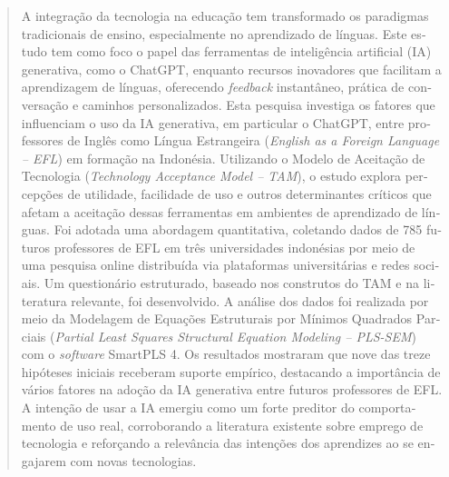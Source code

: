 \documentclass[english]{textolivre}
\begin{document}
\begin{polyabstract}
\begin{portuguese}
\begin{abstract}
A integração da tecnologia na educação tem transformado os paradigmas tradicionais de ensino, especialmente no aprendizado de línguas. Este estudo tem como foco o papel das ferramentas de inteligência artificial (IA) generativa, como o ChatGPT, enquanto recursos inovadores que facilitam a aprendizagem de línguas, oferecendo \textit{feedback} instantâneo, prática de conversação e caminhos personalizados. Esta pesquisa investiga os fatores que influenciam o uso da IA generativa, em particular o ChatGPT, entre professores de Inglês como Língua Estrangeira (\textit{English as a Foreign Language – EFL}) em formação na Indonésia. Utilizando o Modelo de Aceitação de Tecnologia (\textit{Technology Acceptance Model – TAM}), o estudo explora percepções de utilidade, facilidade de uso e outros determinantes críticos que afetam a aceitação dessas ferramentas em ambientes de aprendizado de línguas. Foi adotada uma abordagem quantitativa, coletando dados de 785 futuros professores de EFL em três universidades indonésias por meio de uma pesquisa online distribuída via plataformas universitárias e redes sociais. Um questionário estruturado, baseado nos construtos do TAM e na literatura relevante, foi desenvolvido. A análise dos dados foi realizada por meio da Modelagem de Equações Estruturais por Mínimos Quadrados Parciais (\textit{Partial Least Squares Structural Equation Modeling – PLS-SEM}) com o \textit{software} SmartPLS 4. Os resultados mostraram que nove das treze hipóteses iniciais receberam suporte empírico, destacando a importância de vários fatores na adoção da IA generativa entre futuros professores de EFL. A intenção de usar a IA emergiu como um forte preditor do comportamento de uso real, corroborando a literatura existente sobre emprego de tecnologia e reforçando a relevância das intenções dos aprendizes ao se engajarem com novas tecnologias.

\end{abstract}
\end{portuguese}
\end{polyabstract}
\end{document}
